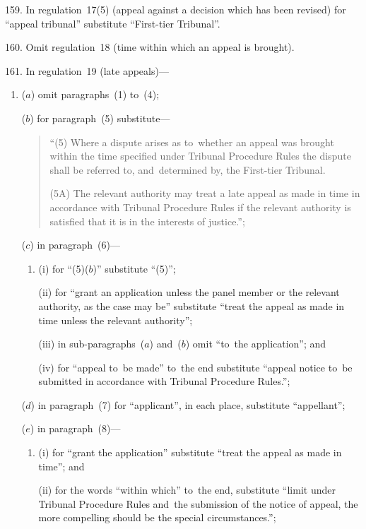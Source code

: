 \documentclass[12pt,a4paper]{article}
\begin{document}
\medskip

159.  In regulation~17(5) (appeal against a decision which has been revised) for “appeal tribunal” substitute “First-tier Tribunal”.

\medskip

160.  Omit regulation~18 (time within which an appeal is brought).

\medskip

161.  In regulation~19 (late appeals)—
\begin{enumerate}\item[]
($a$) omit paragraphs~(1) to~(4);

($b$) for paragraph~(5) substitute—
\begin{quotation}
“(5) Where a dispute arises as to~whether an appeal was brought within the time specified under Tribunal Procedure Rules the dispute shall be referred to, and~determined by, the First-tier Tribunal.

(5A) The relevant authority may treat a late appeal as made in time in accordance with Tribunal Procedure Rules if the relevant authority is satisfied that it is in the interests of justice.”;
\end{quotation}

($c$) in paragraph~(6)—
\begin{enumerate}\item[]
(i) for “(5)($b$)” substitute “(5)”;

(ii) for “grant an application unless the panel member or the relevant authority, as the case may be” substitute “treat the appeal as made in time unless the relevant authority”;

(iii) in sub-paragraphs~($a$)  and~($b$)  omit “to~the application”; and

(iv) for “appeal to~be made” to~the end substitute “appeal notice to~be submitted in accordance with Tribunal Procedure Rules.”;
\end{enumerate}

($d$) in paragraph~(7) for “applicant”, in each place, substitute “appellant”;

($e$) in paragraph~(8)—
\begin{enumerate}\item[]
(i) for “grant the application” substitute “treat the appeal as made in time”; and

(ii) for the words “within which” to~the end, substitute “limit under Tribunal Procedure Rules and~the submission of the notice of appeal, the more compelling should be the special circumstances.”;
\end{enumerate}


\end{enumerate}
\end{document}
